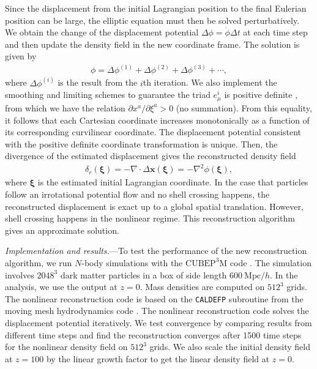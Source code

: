 \documentclass[aps,prl,twocolumn,showpacs,superscriptaddress,groupedaddress,nofootinbib]{revtex4}  %
\newcommand{\mr}{\mathrm}
\newcommand{\bea}{\begin{eqnarray}}
\newcommand{\eea}{\end{eqnarray}}
\begin{document}
Since the displacement from the initial Lagrangian position to the final 
Eulerian position can be large, the elliptic equation must then be solved 
perturbatively. We obtain the change of the displacement potential 
$\Delta\phi=\dot{\phi}\Delta t$ at each time step and then update the density
field in the new coordinate frame.  
The solution is given by 
\bea
\phi=\Delta\phi^{(1)}+\Delta\phi^{(2)}+\Delta\phi^{(3)}+\cdots,
\eea
where $\Delta\phi^{(i)}$ is the result from the $i$th iteration. 
We also implement the smoothing and limiting schemes to guarantee the triad 
$e^i_\mu$ is positive definite \cite{1995ApJS..100..269P,1998ApJS..115...19P},
from which we have the relation $\partial x^a/\partial\xi^a>0$ (no summation).
From this equality, it follows that each Cartesian coordinate increases monotonically as a function of its corresponding curvilinear coordinate.
The displacement potential consistent with the
positive definite coordinate transformation is unique.
Then, the divergence of the estimated displacement gives the 
reconstructed density field 
\bea
\delta_r(\bm{\xi})=-\nabla\cdot\Delta\bm{x}(\bm{\xi})
=-\nabla^2\phi(\bm{\xi}),
\eea
where $\bm{\xi}$ is the estimated initial Lagrangian coordinate.
In the case that particles follow an irrotational potential flow and no shell
crossing happens, the reconstructed displacement is exact up to a global 
spatial translation.
However, shell crossing happens in the nonlinear regime. This reconstruction
algorithm gives an approximate solution.


{\it Implementation and results.}---To test the performance of 
the new reconstruction algorithm, we run $N$-body simulations with 
the $\mr{CUBEP}^3\mr{M}$ code \cite{2013code}.
The simulation involves $2048^3$ dark matter particles in a box of 
side length $600\ \mr{Mpc}/h$.
In the analysis, we use the output at $z=0$. Mass densities are computed
on $512^3$ grids. 
The nonlinear reconstruction code is based on the {\tt CALDEFP} subroutine from 
the moving mesh hydrodynamics code \cite{1998ApJS..115...19P}.
The nonlinear reconstruction code solves the displacement potential iteratively.
We test convergence by comparing results from different time steps and 
find the reconstruction converges after 1500 time steps for the nonlinear 
density field on $512^3$ grids.
We also scale the initial density field at $z=100$ by the linear growth factor
to get the linear density field at $z=0$.
\end{document}

